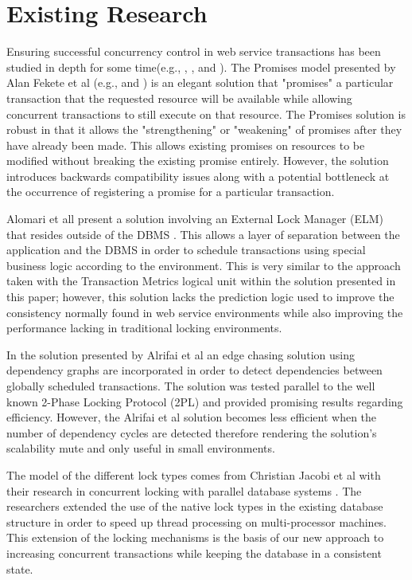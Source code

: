\documentclass[conference]{IEEEtran}
\begin{document}
\section{Existing Research}
Ensuring successful concurrency control in web service transactions has been studied in depth for some time(e.g., \cite{Fekete_Promises}, \cite{Fekete_IsolationSupport}, and \cite{Alrifai_Distributed_Managment}). The Promises model presented by Alan Fekete et al (e.g., \cite{Fekete_Promises} and \cite{Fekete_IsolationSupport}) is an elegant solution that "promises" a particular transaction that the requested resource will be available while allowing concurrent transactions to still execute on that resource. The Promises solution is robust in that it allows the "strengthening" or "weakening" of promises after they have already been made. This allows existing promises on resources to be modified without breaking the existing promise entirely. However, the solution introduces backwards compatibility issues along with a potential bottleneck at the occurrence of registering a promise for a particular transaction.

Alomari et all present a solution involving an External Lock Manager (ELM) that resides outside of the DBMS \cite{Fekete_SnapshotIso}. This allows a layer of separation between the application and the DBMS in order to schedule transactions using special business logic according to the environment. This is very similar to the approach taken with the Transaction Metrics logical unit within the solution presented in this paper; however, this solution lacks the prediction logic used to improve the consistency normally found in web service environments while also improving the performance lacking in traditional locking environments.

In the solution presented by Alrifai et al \cite{Alrifai_Distributed_Managment} an edge chasing solution using dependency graphs are incorporated in order to detect dependencies between globally scheduled transactions. The solution was tested parallel to the well known 2-Phase Locking Protocol (2PL) and provided promising results regarding efficiency. However, the Alrifai et al solution becomes less efficient when the number of dependency cycles are detected therefore rendering the solution's scalability mute and only useful in small environments. 

The model of the different lock types comes from Christian Jacobi et al with their research in concurrent locking with parallel database systems \cite{Jacobi_Locking}. The researchers extended the use of the native lock types in the existing database structure in order to speed up thread processing on multi-processor machines. This extension of the locking mechanisms is the basis of our new approach to increasing concurrent transactions while keeping the database in a consistent state. 
\end{document}
